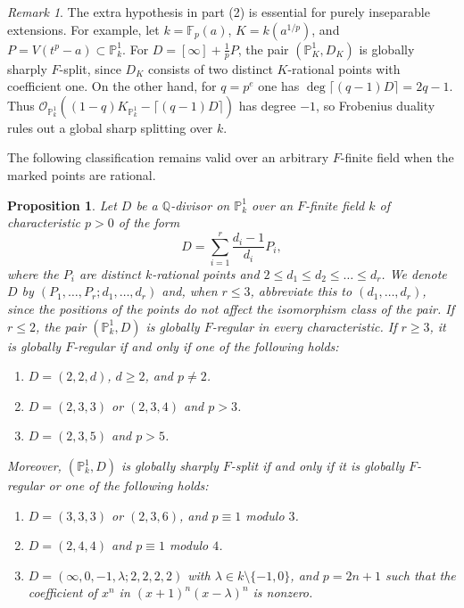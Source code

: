 \documentclass[12pt]{amsart}
\newcommand{\Q}{\mathbb{Q}}
\newcommand{\PP}{\mathbb{P}}
\newcommand{\sO}{\mathcal{O}}
\theoremstyle{plain}
\newtheorem{prop}[thm]{Proposition}
\theoremstyle{definition}
\theoremstyle{remark}
\newtheorem{rem}[thm]{Remark}
\newtheorem{defn and notation}[thm]{Definition and Notation}
\theoremstyle{plain}
\numberwithin{equation}{thm}
\begin{document}
\begin{rem}
The extra hypothesis in part (2) is essential for purely inseparable extensions.
For example, let $k=\mathbb F_p(a)$, $K=k(a^{1/p})$, and
$P=V(t^p-a)\subset\PP^1_k$.
For $D=[\infty]+\frac1pP$, the pair $(\PP^1_K,D_K)$ is globally sharply $F$-split,
since $D_K$ consists of two distinct $K$-rational points with coefficient one.
On the other hand, for $q=p^e$ one has
$\deg\lceil(q-1)D\rceil=2q-1$.
Thus $\sO_{\PP^1_k}((1-q)K_{\PP^1_k}-\lceil(q-1)D\rceil)$ has degree $-1$,
so Frobenius duality rules out a global sharp splitting over $k$.
\end{rem}


The following classification \cite{Watanabe(one-dim)} remains valid over an arbitrary $F$-finite field when the marked points are rational.

\begin{prop}\label{prop:log Fano curve}
    Let $D$ be a $\Q$-divisor on $\mathbb{P}_k^1$ over an $F$-finite field $k$ of characteristic $p>0$ of the form
    \[
    D=\sum_{i=1}^r \frac{d_i-1}{d_i}P_i,
    \]
    where the $P_i$ are distinct $k$-rational points and $2 \leq d_1 \leq d_2 \leq \dots \leq d_r$.
    We denote $D$ by $(P_1, \dots, P_r; d_1,\ldots,d_r)$ and, when $r\leq3$, abbreviate this to $(d_1,\ldots,d_r)$, since the positions of the points do not affect the isomorphism class of the pair.
    If $r\leq2$, the pair $(\mathbb P^1_k,D)$ is globally $F$-regular in every characteristic.
    If $r\geq3$, it is globally $F$-regular if and only if one of the following holds:
    \begin{enumerate}
        \item[\textup{(1)}] $D=(2,2,d)$, $d\geq 2$, and $p\neq 2$.
        \item[\textup{(2)}] $D=(2,3,3)$ or $(2,3,4)$ and $p>3$.
        \item[\textup{(3)}] $D=(2,3,5)$ and $p>5$.
    \end{enumerate}
    Moreover, $(\mathbb{P}^1_k,D)$ is globally sharply $F$-split if and only if it is globally $F$-regular or one of the following holds:
    \begin{enumerate}
        \item[\textup{(4)}] $D=(3,3,3)$ or $(2,3,6)$, and $p\equiv 1$ modulo $3$.
        \item[\textup{(5)}] $D=(2,4,4)$ and $p\equiv 1$ modulo $4$.
        \item[\textup{(6)}] $D=(\infty,0,-1,\lambda;2,2,2,2)$ with $\lambda\in k\setminus\{-1,0\}$, and $p=2n+1$ such that the coefficient of $x^n$ in $(x+1)^n(x-\lambda)^n$ is nonzero.
    \end{enumerate}
\end{prop}
\end{document}
